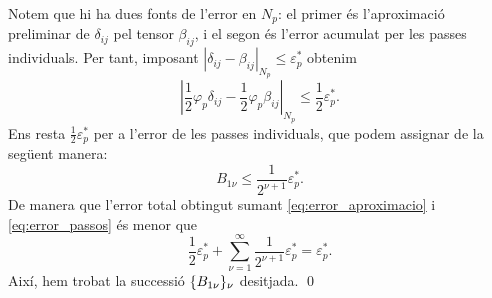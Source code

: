 {Notem que hi ha dues fonts de l'error en $N_p$: el primer és l'aproximació preliminar de $\delta_{ij}$ pel tensor $\beta_{ij}$, i el segon és l'error acumulat per les passes individuals. Per tant, imposant $|\delta_{ij}-\beta_{ij}|_{N_p} \le \varepsilon_p^*$ obtenim 
\begin{equation}\label{eq:error_aproximacio}
    \left|\frac12\varphi_p\delta_{ij}-\frac12\varphi_p\beta_{ij}\right|_{N_p} \le \frac12\varepsilon_p^*.
\end{equation}
Ens resta $\frac12\varepsilon_p^*$
per a l'error de les passes individuals, que podem assignar de la següent manera:
\begin{equation}\label{eq:error_passos}
    B_{1\nu} \le \frac{1}{2^{\nu+1}}\varepsilon_p^*.
\end{equation}
De manera que l'error total obtingut sumant \ref{eq:error_aproximacio} i \ref{eq:error_passos} és menor que
\begin{equation*}
    \frac12\varepsilon_p^* + \sum_{\nu=1}^\infty \frac1{2^{\nu+1}}\varepsilon_p^* = \varepsilon_p^*.
\end{equation*}
Així, hem trobat la successió $\{B_{1\nu}\}_{\nu}$ desitjada.
\qed













}

































\newpage
